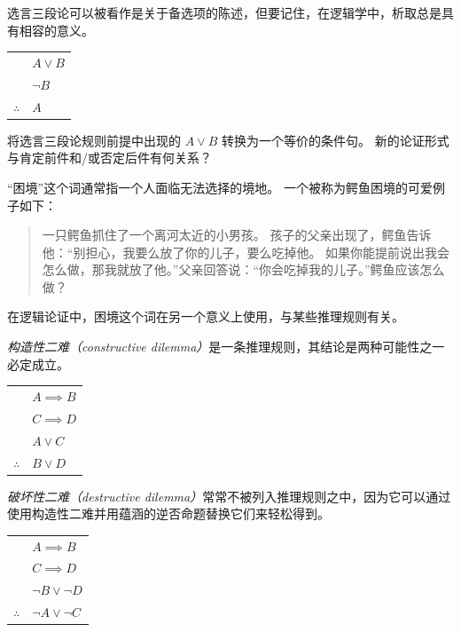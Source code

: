 选言三段论可以被看作是关于备选项的陈述，但要记住，在逻辑学中，析取总是具有相容的意义。

\begin{center}
\begin{tabular}{cl}
 & $A \lor B$ \\
 & ${\lnot}B$ \\ \hline
$\therefore$ & $A$ \\
\end{tabular}
\end{center}

\begin{exer}
将选言三段论规则前提中出现的 $A \lor B$ 转换为一个等价的条件句。
新的论证形式与肯定前件和/或否定后件有何关系？
\end{exer}

“困境”这个词通常指一个人面临无法选择的境地。
一个被称为鳄鱼困境的可爱例子如下：

\begin{quote}
一只鳄鱼抓住了一个离河太近的小男孩。
孩子的父亲出现了，鳄鱼告诉他：“别担心，我要么放了你的儿子，要么吃掉他。
如果你能提前说出我会怎么做，那我就放了他。”父亲回答说：“你会吃掉我的儿子。”鳄鱼应该怎么做？
\end{quote} 

在逻辑论证中，困境这个词在另一个意义上使用，与某些推理规则有关。

\emph{构造性二难（constructive dilemma）}是一条推理规则，其结论是两种可能性之一必定成立。

\begin{center}
\begin{tabular}{cl}
 & $A \implies B$ \\
 & $C \implies D$ \\ 
 & $A \lor C$ \\ \hline
$\therefore$ & $B \lor D$ \\
\end{tabular}
\end{center}

\emph{破坏性二难（destructive dilemma）}常常不被列入推理规则之中，因为它可以通过使用构造性二难并用蕴涵的逆否命题替换它们来轻松得到。

\begin{center}
\begin{tabular}{cl}
 & $A \implies B$ \\
 & $C \implies D$ \\ 
 & ${\lnot}B \lor {\lnot}D$ \\ \hline
$\therefore$ & ${\lnot}A \lor {\lnot}C$ \\
\end{tabular}
\end{center}

